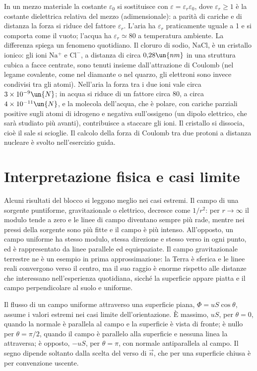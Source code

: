 \documentclass[main.tex]{subfiles}
\begin{document}
In un mezzo materiale la costante $\varepsilon_0$ si sostituisce con $\varepsilon=\varepsilon_r\varepsilon_0$, dove $\varepsilon_r\geq1$ è la costante dielettrica relativa del mezzo (adimensionale): a parità di cariche e di distanza la forza si riduce del fattore $\varepsilon_r$. L'aria ha $\varepsilon_r$ praticamente uguale a 1 e si comporta come il vuoto; l'acqua ha $\varepsilon_r\simeq80$ a temperatura ambiente. La differenza spiega un fenomeno quotidiano. Il cloruro di sodio, $\mathrm{NaCl}$, è un cristallo ionico: gli ioni $\mathrm{Na^+}$ e $\mathrm{Cl^-}$, a distanza di circa $0{,}28\un{nm}$ in una struttura cubica a facce centrate, sono tenuti insieme dall'attrazione di Coulomb (nel legame covalente, come nel diamante o nel quarzo, gli elettroni sono invece condivisi tra gli atomi). Nell'aria la forza tra i due ioni vale circa $3\times10^{-9}\un{N}$; in acqua si riduce di un fattore circa 80, a circa $4\times10^{-11}\un{N}$, e la molecola dell'acqua, che è polare, con cariche parziali positive sugli atomi di idrogeno e negativa sull'ossigeno (un dipolo elettrico, che sarà studiato più avanti), contribuisce a staccare gli ioni. Il cristallo si dissocia, cioè il sale si scioglie. Il calcolo della forza di Coulomb tra due protoni a distanza nucleare è svolto nell'esercizio guida.


\section*{Interpretazione fisica e casi limite}
Alcuni risultati del blocco si leggono meglio nei casi estremi. Il campo di una sorgente puntiforme, gravitazionale o elettrico, decresce come $1/r^2$: per $r\to\infty$ il modulo tende a zero e le linee di campo diventano sempre più rade, mentre nei pressi della sorgente sono più fitte e il campo è più intenso. All'opposto, un campo uniforme ha stesso modulo, stessa direzione e stesso verso in ogni punto, ed è rappresentato da linee parallele ed equispaziate. Il campo gravitazionale terrestre ne è un esempio in prima approssimazione: la Terra è sferica e le linee reali convergono verso il centro, ma il suo raggio è enorme rispetto alle distanze che interessano nell'esperienza quotidiana, sicché la superficie appare piatta e il campo perpendicolare al suolo e uniforme.

Il flusso di un campo uniforme attraverso una superficie piana, $\Phi=uS\cos\theta$, assume i valori estremi nei casi limite dell'orientazione. È massimo, $uS$, per $\theta=0$, quando la normale è parallela al campo e la superficie è vista di fronte; è nullo per $\theta=\pi/2$, quando il campo è parallelo alla superficie e nessuna linea la attraversa; è opposto, $-uS$, per $\theta=\pi$, con normale antiparallela al campo. Il segno dipende soltanto dalla scelta del verso di $\vec n$, che per una superficie chiusa è per convenzione uscente.
\end{document}
